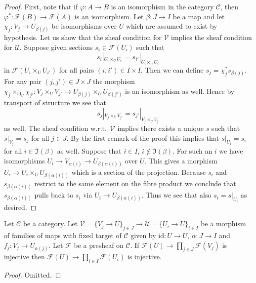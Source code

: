 \begin{proof}
First, note that if $\varphi : A \to B$ is an isomorphism in the
category $\mathcal{C}$, then $\varphi^* : \mathcal{F}(B) \to \mathcal{F}(A)$
is an isomorphism. Let $\beta : J \to I$ be a map and let
$\chi_j : V_j \to U_{\beta(j)}$ be isomorphisms over $U$ which
are assumed to exist by hypothesis. Let us show that the sheaf
condition for $\mathcal{V}$ implies the sheaf condition for $\mathcal{U}$.
Suppose given sections $s_i \in \mathcal{F}(U_i)$ such that
$$
s_i|_{U_i \times_U U_{i'}} = s_{i'}|_{U_i \times_U U_{i'}}
$$
in $\mathcal{F}(U_i \times_U U_{i'})$ for all pairs $(i, i') \in I \times I$.
Then we can define $s_j = \chi_j^*s_{\beta(j)}$. For any pair
$(j, j') \in J \times J$ the morphism
$\chi_j \times_{\text{id}_U} \chi_{j'} : V_j \times_U V_{j'} \to
U_{\beta(j)} \times_U U_{\beta(j')}$ is an isomorphism as well.
Hence by transport of structure we see that
$$
s_j|_{V_j \times_U V_{j'}} = s_{j'}|_{V_j \times_U V_{j'}}
$$
as well. The sheaf condition w.r.t.\ $\mathcal{V}$ implies there
exists a unique $s$ such that $s|_{V_j} = s_j$ for all $j \in J$.
By the first remark of the proof this implies that $s|_{U_i} = s_i$
for all $i \in \Im(\beta)$ as well. Suppose that $i \in I$,
$i \not \in \Im(\beta)$. For such an $i$ we have isomorphisms
$U_i \to V_{\alpha(i)} \to U_{\beta(\alpha(i))}$ over $U$. This gives a
morphism $U_i \to U_i \times_U U_{\beta(\alpha(i))}$ which is a
section of the projection. Because $s_i$ and $s_{\beta(\alpha(i))}$
restrict to the same element on the fibre product we conclude that
$s_{\beta(\alpha(i))}$ pulls back to $s_i$ via $U_i \to U_{\beta(\alpha(i))}$.
Thus we see that also $s_i = s|_{U_i}$ as desired.
\end{proof}

\begin{lemma}
\label{lemma-compare-separated-presheaf-condition}
Let $\mathcal{C}$ be a category. Let $\mathcal{V} = \{V_j \to U\}_{j \in J} \to
\mathcal{U} = \{U_i \to U\}_{i \in I}$ be a morphism of families of maps
with fixed target of $\mathcal{C}$ given by $\text{id} : U \to U$,
$\alpha : J \to I$ and $f_j : V_j \to U_{\alpha(j)}$. Let $\mathcal{F}$
be a presheaf on $\mathcal{C}$. If
$\mathcal{F}(U) \to \prod_{j \in J} \mathcal{F}(V_j)$ is
injective then
$\mathcal{F}(U) \to \prod_{i \in I} \mathcal{F}(U_i)$ is
injective.
\end{lemma}

\begin{proof}
Omitted.
\end{proof}

